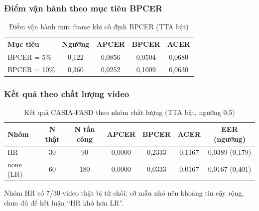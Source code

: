 \documentclass[12pt,a4paper]{article}
\begin{document}
\subsubsection{Điểm vận hành theo mục tiêu BPCER}
\begin{table}[H]
  \centering
  \caption{Điểm vận hành mức frame khi cố định BPCER (TTA bật)}
  \label{tab:fas-operating}
  \small
  \begin{tabular}{@{}lcccc@{}}
    \toprule
    \textbf{Mục tiêu} & \textbf{Ngưỡng} & \textbf{APCER} & \textbf{BPCER} & \textbf{ACER}\\
    \midrule
    BPCER = 5\% & 0,122 & 0,0856 & 0,0504 & 0,0680\\
    BPCER = 10\% & 0,360 & 0,0252 & 0,1009 & 0,0630\\
    \bottomrule
  \end{tabular}
\end{table}

\subsubsection{Kết quả theo chất lượng video}
\begin{table}[H]
  \centering
  \caption{Kết quả CASIA-FASD theo nhóm chất lượng (TTA bật, ngưỡng 0,5)}
  \label{tab:fas-quality}
  \small
  \begin{tabular}{@{}lcccccc@{}}
    \toprule
    \textbf{Nhóm} & \textbf{N thật} & \textbf{N tấn công} & \textbf{APCER} & \textbf{BPCER} & \textbf{ACER} & \textbf{EER (ngưỡng)}\\
    \midrule
    HR & 30 & 90 & 0,0000 & 0,2333 & 0,1167 & 0,0389 (0,179)\\
    none (LR) & 60 & 180 & 0,0000 & 0,0333 & 0,0167 & 0,0167 (0,401)\\
    \bottomrule
  \end{tabular}
\end{table}
Nhóm HR có 7/30 video thật bị từ chối; cỡ mẫu nhỏ nên khoảng tin cậy rộng, chưa đủ để kết luận
``HR khó hơn LR''.
\end{document}
